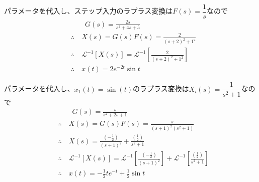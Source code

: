 \documentclass[a4paper,12pt]{article}
\begin{document}
\begin{tcolorbox}[title={5. (4)\(m=1,d_1=2,d_2=2,k=5\)とし、ステップ応答を求めよ。 }]

    パラメータを代入し、ステップ入力のラプラス変換は\(F(s)=\dfrac{1}{s}\)なので
    \vspace{-4mm}
    \begin{align*}
        &\qquad G(s) = \frac{2s}{s^2 + 4s + 5 } \\
        &\therefore \quad X(s) = G(s) F(s) 
        = \frac{2}{(s+2)^2+1^2} \\
        &\therefore \quad \mathcal{L}^{-1} \left[ X(s)\right] 
        = \mathcal{L}^{-1} \left[\frac{2}{(s+2)^2+1^2}\right] \\
        &\therefore \quad x(t) = 2e^{-2t} \sin t
    \end{align*}

\end{tcolorbox}

\begin{tcolorbox}[title={5. (5)\(m=1,d_1=1,d_2=1,k=1\)とし、入力変位\(x_1(t)=\sin(t)\)を与えたときの応
\indent \quad 答を求めよ。 }]

パラメータを代入し、\(x_1(t)=\sin(t)\)のラプラス変換は\(X_i(s)=\dfrac{1}{s^2+1}\)なので
    \vspace{-4mm}
    \begin{align*}
        &\qquad G(s) = \frac{s}{s^2 + 2s + 1} \\
        &\therefore \quad X(s) = G(s) F(s) = \frac{s}{(s+1)^2(s^2 +1)} \\
        &\therefore \quad X(s) =  \frac{\left(-\frac{1}{2}\right)}{(s+1)^2}
        + \frac{\left(\frac{1}{2}\right)}{s^2 +1}\\
        &\therefore \quad \mathcal{L}^{-1} \left[ X(s)\right] 
        = \mathcal{L}^{-1} \left[\frac{\left(-\frac{1}{2}\right)}{(s+1)^2}\right]
        + \mathcal{L}^{-1} \left[\frac{\left(\frac{1}{2}\right)}{s^2 +1}\right] \\
        &\therefore \quad x(t) = -\frac{1}{2} t e^{-t} + \frac{1}{2} \sin t
    \end{align*}

\end{tcolorbox}
\end{document}
